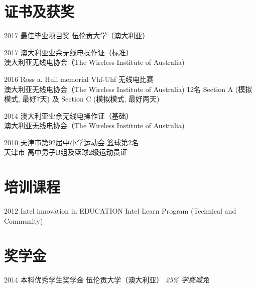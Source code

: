 \documentclass[]{friggeri-cv}
\begin{document}
\section{证书及获奖}
\begin{entrylist}
  \entry
    {2017}
    {最佳毕业项目奖}
    {伍伦贡大学（澳大利亚）}

  \entry
    {2017}
    {澳大利亚业余无线电操作证（标准）\\}
    {澳大利亚无线电协会（The Wireless Institute of Australia)}

  \entry
    {2016}
    {Ross a. Hull memorial Vhf-Uhf 无线电比赛\\}
    {澳大利亚无线电协会（The Wireless Institute of Australia)}
    {12名 Section A (模拟模式, 最好7天) 及 Section C (模拟模式, 最好两天)}

  \entry
    {2014}
    {澳大利亚业余无线电操作证（基础）\\}
    {澳大利亚无线电协会（The Wireless Institute of Australia)}
   
  \entry
    {2010}
    {天津市第92届中小学运动会 篮球第2名\\}
    {天津市}
    {高中男子B组及篮球2级运动员证}

\end{entrylist}

\section{培训课程}
\begin{entrylist}
  \entry
    {2012}
    {Intel innovation in EDUCATION}
    {Intel Learn Program (Technical and Community)}

\end{entrylist}

\section{奖学金}
\begin{entrylist}
  \entry
    {2014}
    {本科优秀学生奖学金}
    {伍伦贡大学（澳大利亚）}
    {\emph{25\% 学费减免}}
\end{entrylist}
\end{document}
